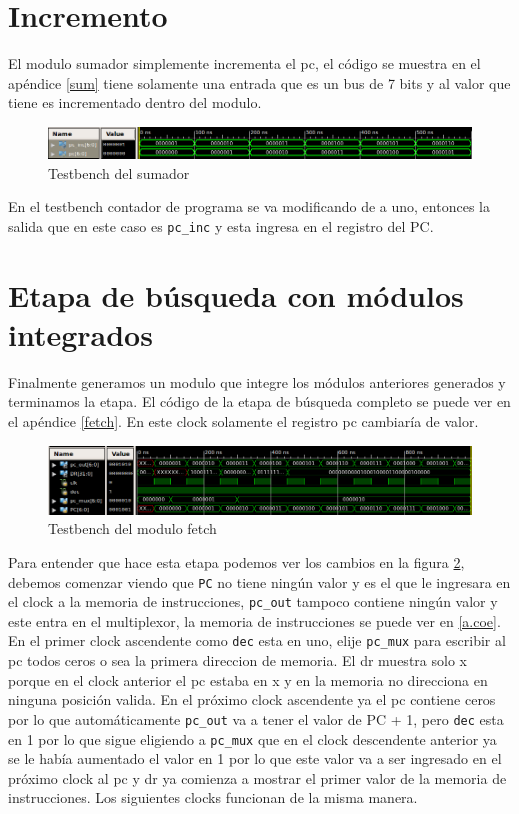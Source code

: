 \section{Incremento}
El modulo sumador simplemente incrementa el \ac{pc}, el código se muestra en el apéndice \ref{sum}  tiene solamente una entrada que es un bus de 7 bits y al valor que tiene es incrementado dentro del modulo. 

\begin{figure}[H]
\centering
\includegraphics[scale=0.45]{Capitulo01/sum_test}
\caption{Testbench del sumador}
\label{fig:sumt}
\end{figure}

En el testbench contador de programa se va modificando de a uno, entonces la salida que en este caso es \texttt{pc\_inc} y esta ingresa en el registro del \ac{PC}. 

\section{Etapa de búsqueda con módulos integrados}
Finalmente generamos un modulo que integre los módulos anteriores generados y terminamos la etapa. El código de la etapa de búsqueda completo se puede ver en el apéndice \ref{fetch}. En este clock solamente el registro \ac{pc} cambiaría de valor. 

\begin{figure}[H]
\centering
\includegraphics[scale=0.45]{Capitulo01/fetch_test}
\caption{Testbench del modulo fetch}
\label{fig:fetcht}
\end{figure}

Para entender que hace esta etapa podemos ver los cambios en la figura \ref{fig:fetcht}, debemos comenzar viendo que \texttt{PC} no tiene ningún valor y es el que le ingresara en el clock a la memoria de instrucciones, \texttt{pc\_out} tampoco contiene ningún valor y este entra en el multiplexor, la memoria de instrucciones se puede ver en \ref{a.coe}.  
En el primer clock ascendente como \texttt{dec} esta en uno, elije \texttt{pc\_mux} para escribir al \ac{pc} todos ceros o sea la primera direccion de memoria. El \ac{dr}  muestra  solo x porque en el clock anterior el \ac{pc} estaba en x y en la memoria no direcciona en ninguna posición valida. En el próximo clock ascendente ya el \ac{pc} contiene ceros por lo que automáticamente \texttt{pc\_out} va a tener el valor de \ac{PC} + 1, pero \texttt{dec} esta en 1 por lo que sigue eligiendo a \texttt{pc\_mux} que en el clock descendente anterior ya se le había aumentado el valor en 1 por lo que este valor va a ser ingresado en el próximo clock al \ac{pc} y \ac{dr} ya comienza a mostrar el primer valor de la memoria de instrucciones. Los siguientes clocks funcionan de la misma manera.

